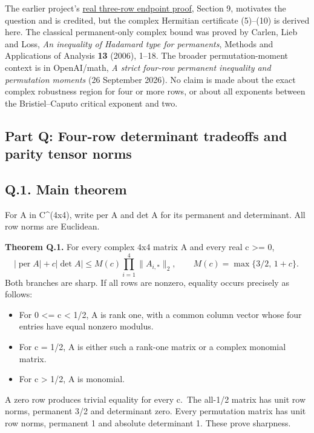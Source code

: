 \documentclass[
  11pt,
]{article}
\providecommand{\tightlist}{%
  \setlength{\itemsep}{0pt}\setlength{\parskip}{0pt}}
\begin{document}
The earlier project's
\href{../../notes/sharp-robust-permanent/paper.md}{real three-row
endpoint proof}, Section 9, motivates the question and is credited, but
the complex Hermitian certificate (5)--(10) is derived here. The
classical permanent-only complex bound was proved by Carlen, Lieb and
Loss, \emph{An inequality of Hadamard type for permanents}, Methods and
Applications of Analysis \textbf{13} (2006), 1--18. The broader
permutation-moment context is in OpenAI/math, \emph{A strict four-row
permanent inequality and permutation moments} (26 September 2026). No
claim is made about the exact complex robustness region for four or more
rows, or about all exponents between the Bristiel--Caputo critical
exponent and two.

\subsection{Part Q: Four-row determinant tradeoffs and parity tensor
norms}\label{part-q-four-row-determinant-tradeoffs-and-parity-tensor-norms}

\subsection{Q.1. Main theorem}\label{q.1.-main-theorem}

For A in C\^{}(4x4), write per A and det A for its permanent and
determinant. All row norms are Euclidean.

\textbf{Theorem Q.1.} For every complex 4x4 matrix A and every real c
\textgreater= 0, \[
\boxed{
|\operatorname{per}A|+c|\det A|
\le M(c)\prod_{i=1}^4\|A_{i,*}\|_2,\qquad
M(c)=\max\{3/2,\,1+c\}.
}\ \tag{Q.1}
\] Both branches are sharp. If all rows are nonzero, equality occurs
precisely as follows:

\begin{itemize}
\tightlist
\item
  For 0 \textless= c \textless{} 1/2, A is rank one, with a common
  column vector whose four entries have equal nonzero modulus.
\item
  For c = 1/2, A is either such a rank-one matrix or a complex monomial
  matrix.
\item
  For c \textgreater{} 1/2, A is monomial.
\end{itemize}

A zero row produces trivial equality for every c.~The all-1/2 matrix has
unit row norms, permanent 3/2 and determinant zero. Every permutation
matrix has unit row norms, permanent 1 and absolute determinant 1. These
prove sharpness.
\end{document}
